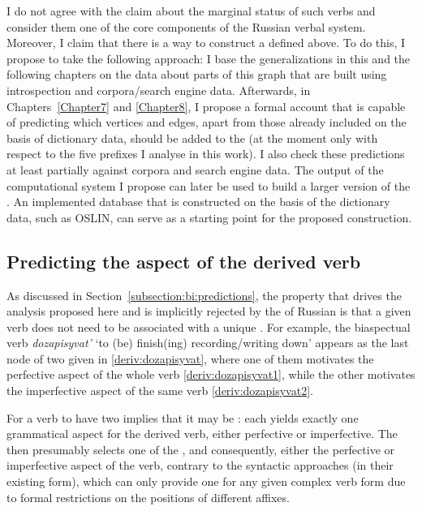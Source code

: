 I do not agree with the claim about the marginal status of such verbs and consider them one of the core components of the Russian verbal system. Moreover, I claim that there is a way to construct a  defined above. To do this, I propose to take the following approach: I base the generalizations in this and the following chapters on the data about parts of this graph that are built using introspection and corpora/search engine data. Afterwards, in Chapters~\ref{Chapter7} and \ref{Chapter8}, I propose a formal account that is capable of predicting which vertices and edges, apart from those already included on the basis of dictionary data, should be added to the  (at the moment only with respect to the five prefixes I analyse in this work). I also check these predictions at least partially against corpora and search engine data. The output of the computational system I propose can later be used to build a larger version of the . An implemented database that is constructed on the basis of the dictionary data, such as OSLIN, can serve as a starting point for the proposed construction.

\subsection{Predicting the aspect of the derived verb}\label{subsection:predict}
As discussed in Section~\ref{subsection:bi:predictions}, the property that drives the analysis proposed here and is implicitly rejected by the  of Russian  is that a given verb does not need to be associated with a unique . For example, the biaspectual verb \textit{dozapisyvat'} `to (be) finish(ing) recording/writing down' appears as the last node of two  given in \ref{deriv:dozapisyvat}, where one of them motivates the perfective aspect of the whole verb \ref{deriv:dozapisyvat1}, while the other motivates the imperfective aspect of the same verb \ref{deriv:dozapisyvat2}.

For a verb to have two  implies that it may be : each  yields exactly one grammatical aspect for the derived verb, either perfective or imperfective. The  then presumably selects one of the , and consequently, either the perfective or imperfective aspect of the verb, contrary to the syntactic approaches (in their existing form), which can only provide one  for any given complex verb form due to formal restrictions on the positions of different affixes.

